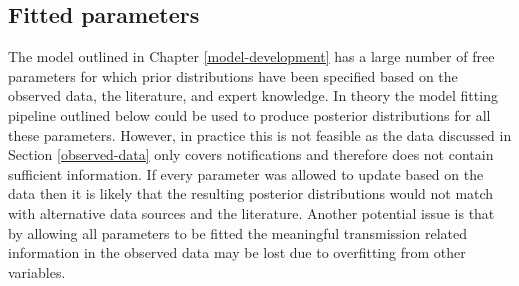 \documentclass[11pt,twoside]{bristolthesis}
\begin{document}
  \hypertarget{fitted-parameters}{%
  \subsection{Fitted parameters}\label{fitted-parameters}}
  
  The model outlined in Chapter \ref{model-development} has a large number of free parameters for which prior distributions have been specified based on the observed data, the literature, and expert knowledge. In theory the model fitting pipeline outlined below could be used to produce posterior distributions for all these parameters. However, in practice this is not feasible as the data discussed in Section \ref{observed-data} only covers notifications and therefore does not contain sufficient information. If every parameter was allowed to update based on the data then it is likely that the resulting posterior distributions would not match with alternative data sources and the literature. Another potential issue is that by allowing all parameters to be fitted the meaningful transmission related information in the observed data may be lost due to overfitting from other variables.
  
\end{document}
